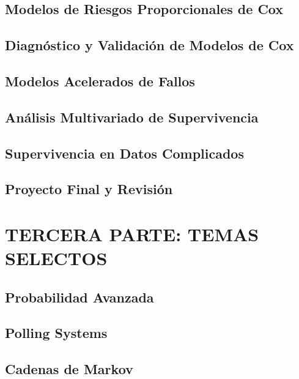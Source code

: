 \documentclass{report}
\begin{document}
\chapter{Modelos de Riesgos Proporcionales de Cox}


\chapter{Diagnóstico y Validación de Modelos de Cox}


\chapter{Modelos Acelerados de Fallos}


\chapter{Análisis Multivariado de Supervivencia}


\chapter{Supervivencia en Datos Complicados}

\chapter{Proyecto Final y Revisión}


\part{TERCERA PARTE: TEMAS SELECTOS}

\chapter{Probabilidad Avanzada}
%

\chapter{Polling Systems}


\chapter{Cadenas de Markov}

\end{document}
